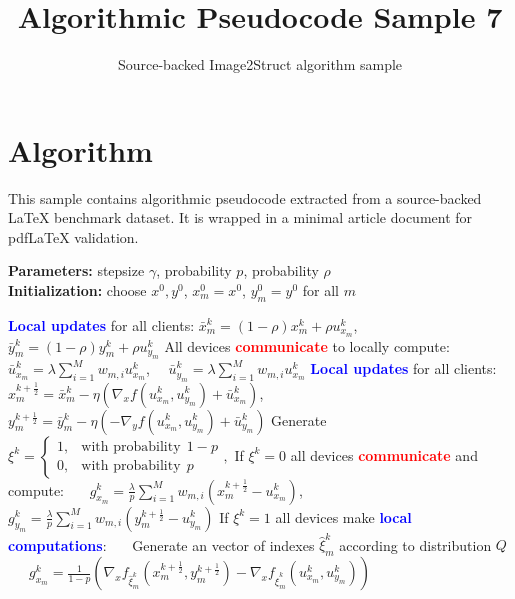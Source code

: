 \documentclass[11pt]{article}
\title{Algorithmic Pseudocode Sample 7}
\author{Source-backed Image2Struct algorithm sample}
\date{}
\begin{document}
\maketitle
\section{Algorithm}
This sample contains algorithmic pseudocode extracted from a source-backed LaTeX benchmark dataset. It is wrapped in a minimal article document for pdfLaTeX validation.

\begin{algorithm}[htbp]
\caption{Source-backed algorithmic procedure}
\begin{algorithm}
[h]
\caption{Randomized for Decentralized Min-Max (RDMM)}
\hspace*{\algorithmicindent} {\bf Parameters:} stepsize $\gamma$, probability $p$, probability $\rho$\\
\hspace*{\algorithmicindent} {\bf Initialization:} choose $ x^0,y^0$, $x^0_m = x^0$, $y^0_m = y^0$ for all $m$
\begin{algorithmic}[1]
\Statex \textcolor{blue}{\textbf{Local updates}} for all clients:
\State $\bar x_m^k = (1 - \rho) x_m^k + \rho u^k_{x_m}$, \ \ $\bar y_m^k = (1 - \rho) y_m^k + \rho u^k_{y_m}$
\Statex All devices \textcolor{red}{\textbf{communicate}} to locally compute:
\State $\bar u_{x_m}^k = \lambda\sum_{i=1}^M w_{m,i} u_{x_m}^k$, \ \ $\bar u_{y_m}^k = \lambda\sum_{i=1}^M w_{m,i} u_{x_m}^k$
\Statex \textcolor{blue}{\textbf{Local updates}} for all clients:
\State $x_m^{k+\frac{1}{2}} = \bar x_m^k - \eta (\nabla_x f(u^k_{x_m}, u^k_{y_m}) + \bar u_{x_m}^k)$,
\State $y_m^{k+\frac{1}{2}} = \bar y_m^k - \eta ( - \nabla_y f(u^k_{x_m}, u^k_{y_m}) + \bar u_{y_m}^k) $
\Statex Generate $\xi^k = \begin{cases}
1,& \text{with probability} ~~ 1 - p \\
0 ,& \text{with probability} ~~ p
\end{cases},$
\Statex If $\xi^k = 0$ all devices \textcolor{red}{\textbf{communicate}} and compute: \State \ \ \ $g_{x_m}^k = \frac{\lambda}{p}\sum_{i=1}^M w_{m,i} \left(x^{k+\frac{1}{2}}_{m} - u_{x_m}^k\right)$, \ \ \ $g_{y_m}^k = \frac{\lambda}{p}\sum_{i=1}^M w_{m,i} \left(y^{k+\frac{1}{2}}_{m} - u_{y_m}^k\right)$
\Statex If $\xi^k = 1$ all devices make \textcolor{blue}{\textbf{local computations}}: \Statex \ \ \ Generate an vector of indexes $\hat{\xi}^k_m$ according to distribution $Q$
\State \ \ \ $g_{x_m}^k = \frac{1}{1-p}\left(\nabla_x f_{\hat{\xi}_m^k}\left(x_m^{k+\frac{1}{2}}, y_m^{k+\frac{1}{2}}\right) - \nabla_x f_{\hat{\xi}_m^k}(u_{x_m}^{k}, u_{y_m}^{k})\right)$

\end{algorithmic}
\end{algorithm}
\end{algorithm}
\end{document}
